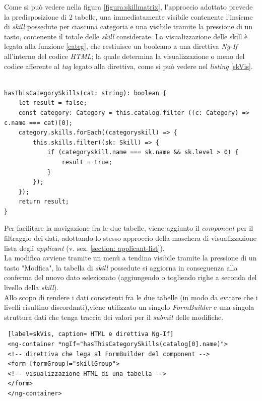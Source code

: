 Come si può vedere nella figura \ref{figura:skillmatrix}, l'approccio adottato prevede la predisposizione di 2 tabelle, una immediatamente visibile contenente l'insieme di \textit{skill} possedute per ciascuna categoria e una visibile tramite la pressione di un tasto, contenente il totale delle \textit{skill} considerate. La visualizzazione delle skill è legata alla funzione \ref{categ}, che restiuisce un booleano a una direttiva \textit{Ng-If} all'interno del codice \textit{HTML}; la quale determina la visualizzazione o meno del codice afferente al \textit{tag} legato alla direttiva, come si può vedere nel \textit{listing} \ref{skVis}.\\
\newpage
\begin{lstlisting}[label=categ, caption=Funzione che determina la visualizzazione di una categoria avente \textit{skills} possedute ]

hasThisCategorySkills(cat: string): boolean {
	let result = false;
	const category: Category = this.catalog.filter ((c: Category) => c.name === cat)[0];
	category.skills.forEach((categoryskill) => {
		this.skills.filter((sk: Skill) => {
			if (categoryskill.name === sk.name && sk.level > 0) {
				result = true;
			}
		});
	});
	return result;
}

\end{lstlisting}

Per facilitare la navigazione fra le due tabelle, viene aggiunto il \textit{component} per il filtraggio dei dati, adottando lo stesso approccio della maschera di visualizzazione lista degli \textit{applicant} (v. sez. \ref{section: applicant-list}).\\
La modifica avviene tramite un menù a tendina visibile tramite la pressione di un tasto "Modfica", la tabella di \textit{skill} possedute si aggiorna in conseguenza alla conferma del nuovo dato selezionato (aggiungendo o togliendo righe a seconda del livello della \textit{skill}).\\
Allo scopo di rendere i dati consistenti fra le due tabelle (in modo da evitare che i livelli risultino discordanti),viene utilizzato un singolo \textit{FormBuilder} e una singola struttura dati che tenga traccia dei valori per il \textit{submit} delle modifiche.\\
 
 
 \begin{lstlisting} [label=skVis, caption= HTML e direttiva Ng-If]
 <ng-container *ngIf="hasThisCategorySkills(catalog[0].name)">
 <!-- direttiva che lega al FormBuilder del component -->
 <form [formGroup]="skillGroup">
 <!-- visualizzazione HTML di una tabella -->
 </form>
 </ng-container>
 \end{lstlisting}
 
